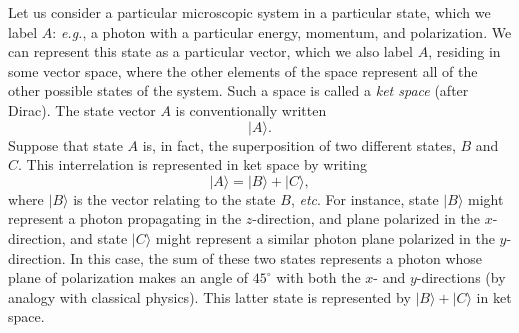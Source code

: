 Let us consider a particular microscopic system in a particular state, which we
label $A$: {\em e.g.}, a photon with a particular energy, momentum, and polarization.
We can represent this state as a particular vector, which we also
label $A$, residing in some vector space, where the other elements of the space
represent all of the other possible states of the system. Such a space
is called a {\em ket space} (after Dirac). The state vector $A$ is
conventionally written
\begin{equation}
|A\rangle.
\end{equation}
Suppose that state $A$ is, in fact, the superposition of two different states,
$B$ and $C$. This interrelation is represented in ket space by writing 
\begin{equation}
|A\rangle = |B\rangle + |C\rangle,
\end{equation}
where $|B\rangle$ is the vector relating to the state $B$, {\em etc}. For instance, state
$|B\rangle$ might represent a photon propagating
in the $z$-direction, and plane polarized in the $x$-direction, and state
$|C\rangle$ might represent a similar  photon plane polarized in the $y$-direction. 
In this case,
the sum of these two states represents a photon whose plane of polarization
makes an angle of $45^\circ$ with both the $x$- and $y$-directions (by analogy
with classical physics). This latter state is represented by $|B\rangle+|C\rangle$ in ket
space. 

